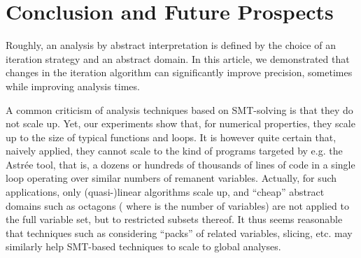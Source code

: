 
\section{Conclusion and Future Prospects}
Roughly, an analysis by abstract interpretation is defined by the choice of an iteration strategy and an abstract domain. In this article, we demonstrated that changes in the iteration algorithm can significantly improve precision, sometimes while improving analysis times.

A common criticism of analysis techniques based on SMT-solving is that they
do not scale up. Yet, our experiments show that, for numerical properties,
they scale up to the size of typical functions and loops.
It is however
quite certain that, naively applied, they cannot scale to the kind of
programs targeted by e.g. the Astr\'ee tool, that is, a dozens or hundreds
of thousands of lines of code in a single loop operating over similar numbers
of remanent variables.
Actually, for such applications, only (quasi-)linear
algorithms scale up, and ``cheap'' abstract domains such as octagons ( where  is the number of variables) are not applied to the full variable set, but to restricted subsets thereof.
It thus seems reasonable that techniques such as considering ``packs'' of related variables, slicing, etc. may similarly help SMT-based techniques to scale to global analyses.

